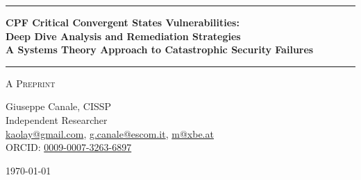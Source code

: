 \documentclass[11pt,a4paper]{article}
\begin{document}
\thispagestyle{empty}
\begin{center}

\vspace*{0.5cm}

\rule{\textwidth}{1.5pt}

\vspace{0.5cm}

{\LARGE \textbf{CPF Critical Convergent States Vulnerabilities:}}\\[0.3cm]
{\LARGE \textbf{Deep Dive Analysis and Remediation Strategies}}\\[0.3cm]
{\LARGE \textbf{A Systems Theory Approach to Catastrophic Security Failures}}

\vspace{0.5cm}

\rule{\textwidth}{1.5pt}

\vspace{0.3cm}

{\large \textsc{A Preprint}}

\vspace{0.5cm}

{\Large Giuseppe Canale, CISSP}\\[0.2cm]
Independent Researcher\\[0.1cm]
\href{mailto:kaolay@gmail.com}{kaolay@gmail.com}, 
\href{mailto:g.canale@escom.it}{g.canale@escom.it}, 
\href{mailto:m8xbe.at}{m@xbe.at}\\[0.1cm]
ORCID: \href{https://orcid.org/0009-0007-3263-6897}{0009-0007-3263-6897}

\vspace{0.8cm}

{\large \today}

\vspace{1cm}

\end{center}
\end{document}
